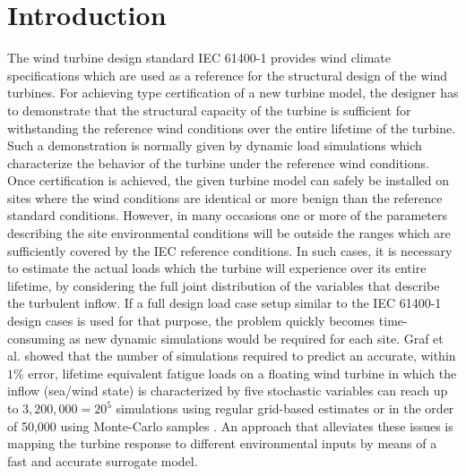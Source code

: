 \documentclass[preprint,12pt]{elsarticle}
\begin{document}

\section{Introduction}
\label{sec_Introduction}

The wind turbine design standard IEC 61400-1 \cite{international2005iec} provides wind climate specifications which are used as a reference for the structural design of the wind turbines. For achieving type certification of a new turbine model, the designer has to demonstrate that the structural capacity of the turbine is sufficient for withstanding the reference wind conditions over the entire lifetime of the turbine. Such a demonstration is normally given by dynamic load simulations which characterize the behavior of the turbine under the reference wind conditions. Once certification is achieved, the given turbine model can safely be installed on sites where the wind conditions are identical or more benign than the reference standard conditions. However, in many occasions one or more of the parameters describing the site environmental conditions will be outside the ranges which are sufficiently covered by the IEC reference conditions. In such cases, it is necessary to estimate the actual loads which the turbine will experience over its entire lifetime, by considering the full joint distribution of the variables that describe the turbulent inflow. If a full design load case setup similar to the IEC 61400-1 design cases is used for that purpose, the problem quickly becomes time-consuming as new dynamic simulations would be required for each site. Graf et al. showed that the number of simulations required to predict an accurate, within $1\%$ error, lifetime equivalent fatigue loads on a floating wind turbine in which the inflow (sea/wind state) is characterized by five stochastic variables can reach up to $3,200,000=20^5$ simulations using regular grid-based estimates or in the order of 50,000 using Monte-Carlo samples \cite{graf2015high}. An approach that alleviates these issues is mapping the turbine response to different environmental inputs by means of a fast and accurate surrogate model.
\end{document}
